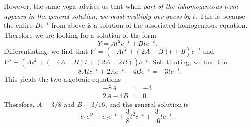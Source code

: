 \documentclass[answers,12pt]{exam}
\begin{document}
\begin{questions}
\begin{solution}
    However, the same yoga advises us that when \emph{part of the inhomogeneous term appears in the general solution, we must multiply our guess by $t$}. This is because the entire $Be^{-t}$ from above is a solution of the associated homogeneous equation. Therefore we are looking for a solution of the form
    \[
        Y = At^2 e^{-t} + Bt e^{-t}.
    \]
    Differentiating, we find that $Y' = (-At^2 + (2A-B)t + B)e^{-t}$ and $Y'' = (At^2 + (-4A + B)t + (2A - 2B))e^{-t}$. Substituting, we find that
    \[
        -8A t e^{-t} + 2A e^{-t} - 4B e^{-t} = -3te^{-t}.
    \]
    This yields the two algebraic equations
    \begin{align*}
        -8A     &= -3 \\
        2A - 4B &= 0.
    \end{align*}
    Therefore, $A = 3/8$ and $B = 3/16$, and the general solution is
    \[
        c_1 e^{3t} + c_2 e^{-t} + \frac{3}{8} t^2 e^{-t} + \frac{3}{16} t e^{-t}.
    \]
\end{solution}

\end{questions}
\end{document}
